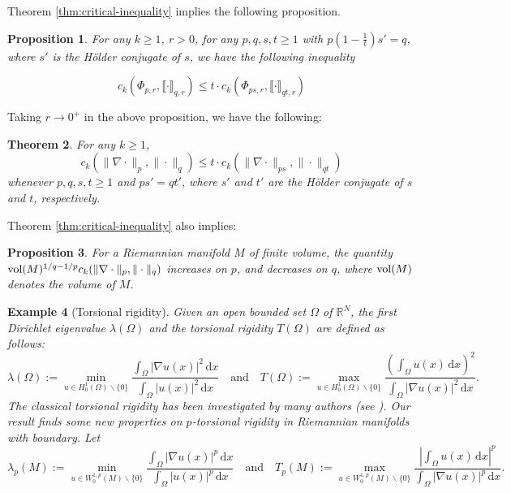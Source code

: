 \documentclass[12pt,a4paper]{article}
\newtheorem{theorem}{Theorem}[section]
\newtheorem{prop}[theorem]{Proposition}
\newtheorem{example}[theorem]{Example}
\begin{document}
Theorem \ref{thm:critical-inequality} implies the following proposition.

\begin{prop}
For any $k\ge 1$, $r>0$, for any $p,q,s,t\ge1$ with $p(1-\frac1t)s'=q$, 
where $s'$ is the H\"older conjugate of $s$,  we have the following inequality 

$$c_k(\Phi_{p,r},\llbracket \cdot\rrbracket_{q,r})\le t\cdot c_k(\Phi_{ps,r},\llbracket \cdot\rrbracket_{qt,r})$$

\end{prop}
Taking $r\to0^+$ in the above proposition, we have the following:
\begin{theorem}\label{thm:grad-pqst}
For any $k\ge 1$, 
  $$c_k( \|\nabla \cdot\|_p,\| \cdot\|_q)\le t\cdot c_k( \|\nabla \cdot\|_{ps},\| \cdot\|_{qt})$$
whenever $p,q,s,t\ge1$ and $ps'=qt'$,  where $s'$ and $t'$ are the H\"older conjugate of $s$ and $t$, respectively. 
\end{theorem}

Theorem \ref{thm:critical-inequality} also implies: 
\begin{prop}\label{pro:volM-mono}For a Riemannian manifold $M$ of finite volume, the quantity $\text{\rm vol}(M)^{1/q-1/p}c_k( \|\nabla \cdot\|_p,\| \cdot\|_q)$ increases on $p$, and decreases on $q$, where $\text{\rm vol}(M)$ denotes the volume of $M$. %
\end{prop}

\begin{example}[Torsional rigidity%
]
Given an open bounded set $\Omega$ of $\mathbb{R}^N$, the first Dirichlet eigenvalue $\lambda(\Omega)$ and the torsional rigidity $T(\Omega)$ are defined as follows:
\[\lambda(\Omega):=\min_{u\in H_{0}^{1}(\Omega)\backslash \{0\}}\frac{\int_{\Omega}|\nabla u(x)|^{2}\,\mathrm{d}x}{\int_{\Omega}|u(x)|^{2}\,\mathrm{d}x}
\quad\text{and}\quad
T(\Omega):= \max_{u\in H_{0}^{1}(\Omega)\backslash \{0\}}\frac{\left(\int_{\Omega}u(x)\,\mathrm{d}x\right)^{2}}{\int_{\Omega}|\nabla u(x)|^{2}\,\mathrm{d}x}.\]
The classical torsional rigidity has been investigated by many authors (see \cite{Berg21,Briani22,Crasta,Della}). %
Our result finds some new properties on $p$-torsional rigidity in  Riemannian manifolds with boundary. 
Let \[\lambda_p(M):=\min_{u\in W_{0}^{1,p}(M)\backslash \{0\}}\frac{\int_{\Omega}|\nabla u(x)|^{p}\,\mathrm{d}x}{\int_{\Omega}|u(x)|^{p}\,\mathrm{d}x}
\quad\text{and}\quad
T_p(M):= \max_{u\in W_{0}^{1,p}(M)\backslash \{0\}}\frac{\left|\int_{\Omega}u(x)\,\mathrm{d}x\right|^{p}}{\int_{\Omega}|\nabla u(x)|^{p}\,\mathrm{d}x}.\]
\end{example}
\end{document}
